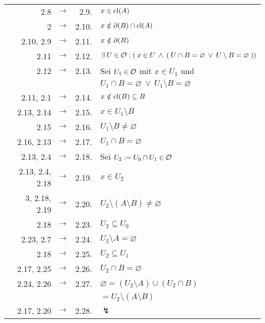 \begin{longtable}{r r c r l}
        & 2.8 & $\rightarrow$ & 2.9. & $x \in \text{cl}(A)$ \\
        & 2 & $\rightarrow$ & 2.10. & $x \notin \partial(B) \cap \text{cl}(A)$ \\
        & 2.10, 2.9 & $\rightarrow$ & 2.11. & $x \notin \partial(B)$ \\
        & 2.11 & $\rightarrow$ & 2.12. & $\exists\: U \in \mathcal{O} : (\: x \in U \:\land\: (\: U \cap B = \varnothing \:\lor\: U \setminus B = \varnothing \:))$ \\
        & 2.12 & $\rightarrow$ & 2.13. & Sei $U_1 \in \mathcal{O}$ mit $x \in U_1$ und\\
                                 &&&& $U_1 \cap B = \varnothing \:\lor\: U_1 \setminus B = \varnothing$ \\
        & 2.11, 2.1 & $\rightarrow$ & 2.14. & $x \notin \text{cl}(B) \subseteq B$ \\
        & 2.13, 2.14 & $\rightarrow$ & 2.15. & $x \in U_1 \setminus B$ \\
        & 2.15 & $\rightarrow$ & 2.16. & $U_1 \setminus B \neq \varnothing$ \\
        & 2.16, 2.13 & $\rightarrow$ & 2.17. & $U_1 \cap B = \varnothing$ \\
        & 2.13, 2.4 & $\rightarrow$ & 2.18. & Sei $U_2 := U_0 \cap U_1 \in \mathcal{O}$ \\
        & 2.13, 2.4, 2.18 & $\rightarrow$ & 2.19. & $x \in U_2$ \\
        & 3, 2.18, 2.19 & $\rightarrow$ & 2.20. & $U_2 \setminus (A \setminus B) \neq \varnothing$ \\
        & 2.18 & $\rightarrow$ & 2.23. & $U_2 \subseteq U_0$ \\
        & 2.23, 2.7 & $\rightarrow$ & 2.24. & $U_2 \setminus A = \varnothing$ \\
        & 2.18 & $\rightarrow$ & 2.25. & $U_2 \subseteq U_1$ \\
        & 2.17, 2.25 & $\rightarrow$ & 2.26. & $U_2 \cap B = \varnothing$ \\
        & 2.24, 2.26 & $\rightarrow$ & 2.27. & $\varnothing = (U_2 \setminus A) \cup (U_2 \cap B)$\\
                                       &&&& $= U_2 \setminus (A \setminus B)$ \\
        & 2.17, 2.20 & $\rightarrow$ & 2.28. & $\lightning$ \\
    \end{longtable}
    
    

